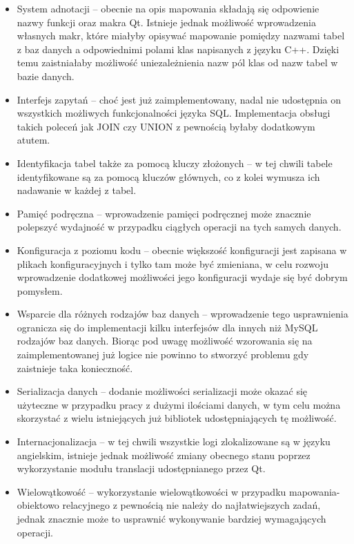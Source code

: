 \documentclass[12pt]{report}
\begin{document}
\begin{itemize}
\item System adnotacji -- obecnie na opis mapowania składają się odpowienie nazwy funkcji oraz makra Qt. Istnieje jednak możliwość wprowadzenia własnych makr, które
miałyby opisywać mapowanie pomiędzy nazwami tabel z baz danych a odpowiednimi polami klas napisanych z języku C++. Dzięki temu zaistniałaby możliwość uniezależnienia
nazw pól klas od nazw tabel w bazie danych.
\item Interfejs zapytań -- choć jest już zaimplementowany, nadal nie udostępnia on wszystkich możliwych funkcjonalności języka SQL. Implementacja obsługi takich poleceń
jak JOIN czy UNION z pewnością byłaby dodatkowym atutem.
\item Identyfikacja tabel także za pomocą kluczy złożonych -- w tej chwili tabele identyfikowane są za pomocą kluczów głównych, co z kolei wymusza ich nadawanie w każdej
z tabel.
\item Pamięć podręczna -- wprowadzenie pamięci podręcznej może znacznie polepszyć wydajność w przypadku ciągłych operacji na tych samych danych.
\item Konfiguracja z poziomu kodu -- obecnie większość konfiguracji jest zapisana w plikach konfiguracyjnych i tylko tam może być zmieniana, w celu rozwoju wprowadzenie
dodatkowej możliwości jego konfiguracji wydaje się być dobrym pomysłem.
\item Wsparcie dla różnych rodzajów baz danych -- wprowadzenie tego usprawnienia ogranicza się do implementacji kilku interfejsów dla innych niż MySQL rodzajów baz 
danych. Biorąc pod uwagę możliwość wzorowania się na zaimplementowanej już logice nie powinno to stworzyć problemu gdy zaistnieje taka konieczność.
\item Serializacja danych -- dodanie możliwości serializacji może okazać się użyteczne w przypadku pracy z dużymi ilościami danych, w tym celu można skorzystać z wielu
istniejących już bibliotek udostępniających tę możliwość.
\item Internacjonalizacja -- w tej chwili wszystkie logi zlokalizowane są w języku angielskim, istnieje jednak możliwość zmiany obecnego stanu poprzez wykorzystanie modułu
translacji udostępnianego przez Qt.
\item Wielowątkowość -- wykorzystanie wielowątkowości w przypadku mapowania-obiektowo relacyjnego z pewnością nie należy do najłatwiejszych zadań, jednak znacznie
może to usprawnić wykonywanie bardziej wymagających operacji.
\end{itemize}
\end{document}
